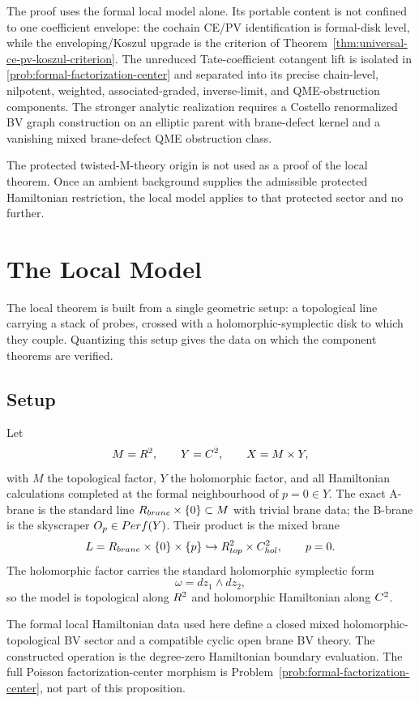 \documentclass[11pt]{memoir}
\begin{document}
The proof uses the formal local model alone.  Its portable content is
not confined to one coefficient envelope: the cochain CE/PV
identification is formal-disk level, while the enveloping/Koszul upgrade
is the criterion of
Theorem~\ref{thm:universal-ce-pv-koszul-criterion}.  The unreduced
Tate-coefficient cotangent lift is isolated in
\ref{prob:formal-factorization-center} and separated into its precise
chain-level, nilpotent, weighted, associated-graded, inverse-limit, and
QME-obstruction components. The stronger analytic realization requires a
Costello renormalized BV graph construction on an elliptic parent with
brane-defect kernel and a vanishing mixed brane-defect QME obstruction
class.

The protected twisted-M-theory origin is not used as a proof of the
local theorem. Once an ambient background supplies the admissible
protected Hamiltonian restriction, the local model applies to that
protected sector and no further.

\section{The Local Model}

The local theorem is built from a single geometric setup: a topological
line carrying a stack of probes, crossed with a holomorphic-symplectic
disk to which they couple. Quantizing this setup gives the data on which
	the component theorems are verified.

\subsection{Setup}
Let
$$M=R^2,\qquad Y=C^2,\qquad X=M\times Y,$$
with $M$ the topological factor, $Y$ the holomorphic factor, and all
Hamiltonian calculations completed at the formal neighbourhood of $p=0\in Y$.
The exact A-brane is the standard line
\(R_{brane}\times\{0\}\subset M\) with trivial brane data;
the B-brane is the skyscraper $O_p\in Perf(Y)$. Their product is
the mixed brane
$$L=R_{brane}\times\{0\}\times\{p\}
  \hookrightarrow R^2_{top}\times C^2_{hol},
  \qquad p=0.$$
The holomorphic factor carries the standard holomorphic symplectic form
$$\omega=dz_1\wedge dz_2,$$
so the model is topological along $R^2$ and holomorphic Hamiltonian along
$C^2$.

\begin{prop}\label{prop:local-model-mixed-definition}
  The formal local Hamiltonian data used here define a closed mixed
  holomorphic-topological BV sector and a compatible cyclic open brane BV
  theory. The constructed operation is the degree-zero Hamiltonian
  boundary evaluation. The full Poisson factorization-center morphism is
  Problem~\ref{prob:formal-factorization-center}, not part of this proposition.
\end{prop}
\end{document}
